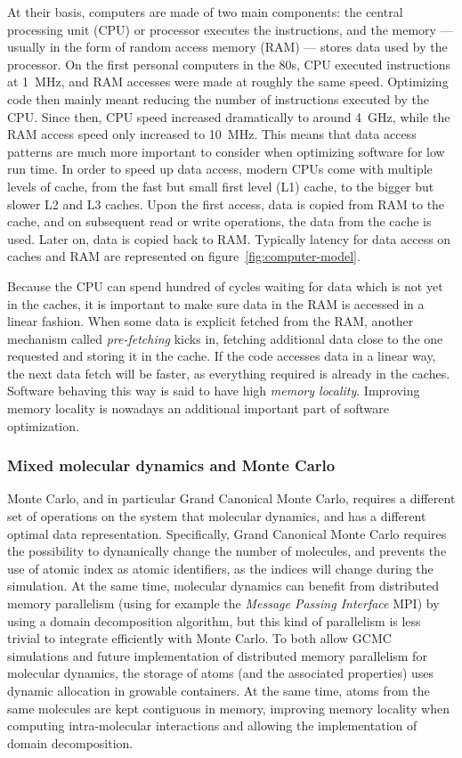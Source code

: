 \documentclass[thesis]{subfiles}
\begin{document}
At their basis, computers are made of two main components: the central
processing unit (CPU) or processor executes the instructions, and the memory ---
usually in the form of random access memory (RAM) --- stores data used by the
processor. On the first personal computers in the 80s, CPU executed instructions
at \SI{1}{MHz}, and RAM accesses were made at roughly the same speed. Optimizing
code then mainly meant reducing the number of instructions executed by the CPU.
Since then, CPU speed increased dramatically to around \SI{4}{GHz}, while the
RAM access speed only increased to \SI{10}{MHz}. This means that data access
patterns are much more important to consider when optimizing software for low
run time. In order to speed up data access, modern CPUs come with multiple
levels of cache, from the fast but small first level (L1) cache, to the bigger
but slower L2 and L3 caches. Upon the first access, data is copied from RAM to
the cache, and on subsequent read or write operations, the data from the cache
is used. Later on, data is copied back to RAM. Typically latency for data access
on caches and RAM are represented on figure~\ref{fig:computer-model}.
\newpage

Because the CPU can spend hundred of cycles waiting for data which is not yet in
the caches, it is important to make sure data in the RAM is accessed in a linear
fashion. When some data is explicit fetched from the RAM, another mechanism
called \emph{pre-fetching} kicks in, fetching additional data close to the one
requested and storing it in the cache. If the code accesses data in a linear
way, the next data fetch will be faster, as everything required is already in
the caches. Software behaving this way is said to have high \emph{memory
locality}. Improving memory locality is nowadays an additional important part of
software optimization.

\subsubsection{Mixed molecular dynamics and Monte Carlo}

Monte Carlo, and in particular Grand Canonical Monte Carlo, requires a different
set of operations on the system that molecular dynamics, and has a different
optimal data representation. Specifically, Grand Canonical Monte Carlo requires
the possibility to dynamically change the number of molecules, and prevents the
use of atomic index as atomic identifiers, as the indices will change during the
simulation. At the same time, molecular dynamics can benefit from distributed
memory parallelism (using for example the \emph{Message Passing Interface} MPI)
by using a domain decomposition algorithm, but this kind of parallelism is less
trivial to integrate efficiently with Monte Carlo. To both allow GCMC
simulations and future implementation of distributed memory parallelism for
molecular dynamics, the storage of atoms (and the associated properties) uses
dynamic allocation in growable containers. At the same time, atoms from the same
molecules are kept contiguous in memory, improving memory locality when
computing intra-molecular interactions and allowing the implementation of domain
decomposition.
\end{document}
